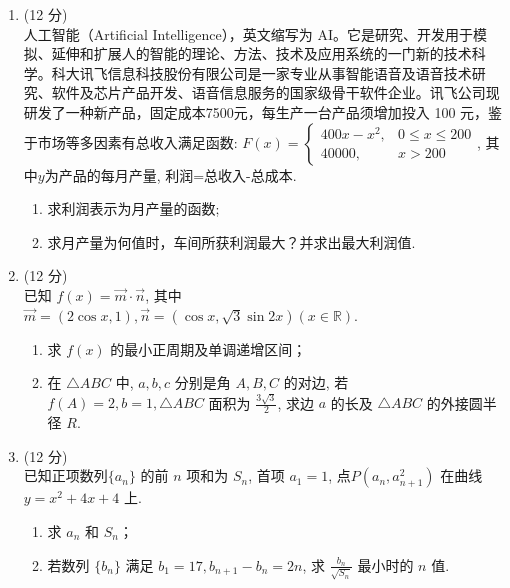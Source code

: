 \documentclass[17pt,twoside,space]{ctexart}
\begin{document}
\begin{enumerate}[itemsep=-0.3em,topsep=0pt,resume]
\vspace{220pt}

\item (12 分)\\
人工智能（Artificial Intelligence），英文缩写为 AI。它是研究、开发用于模拟、延伸和扩展人的智能的理论、方法、技术及应用系统的一门新的技术科学。科大讯飞信息科技股份有限公司是一家专业从事智能语音及语音技术研究、软件及芯片产品开发、语音信息服务的国家级骨干软件企业。讯飞公司现研发了一种新产品，固定成本7500元，每生产一台产品须增加投入 100 元，鉴于市场等多因素有总收入满足函数: $F(x) = \left\{\begin{array}{ll}
	400x-x^2, & 0 \leqslant x \leqslant 200\\
	40000, & x > 200
	\end{array}\right.$, 其中$y$为产品的每月产量, 利润=总收入-总成本.
	\begin{enumerate}[itemsep=-0.3em,label={(\arabic*)},topsep=0pt,labelsep=.5em,leftmargin=1.7em]
		\item 求利润表示为月产量的函数; 
		\item 求月产量为何值时，车间所获利润最大？并求出最大利润值. 
	\end{enumerate}

\newpage

\item (12 分)\\
已知 $f(x) = \vec{m} \cdot \vec{n}$, 其中 $\vec{m}=(2\cos x, 1), \vec{n}=(\cos x, \sqrt{3}\sin 2x) (x\in \mathbb{R})$. 
    \begin{enumerate}[itemsep=-0.3em,label={(\arabic*)},topsep=0pt,labelsep=.5em,leftmargin=1.7em]
		\item 求 $f(x)$ 的最小正周期及单调递增区间；
		\item 在 $\triangle ABC$ 中, $a, b, c$ 分别是角 $A, B, C$ 的对边, 若 $f(A)=2, b=1, \triangle ABC$ 面积为 $\frac{3\sqrt{3}}{2}$, 求边 $a$ 的长及 $\triangle ABC$ 的外接圆半径 $R$.
	\end{enumerate}

	\vspace{250pt}

\item (12 分)\\
已知正项数列$\{a_n\}$ 的前 $n$ 项和为 $S_n$, 首项 $a_1=1$,  点$P(a_n, a_{n+1}^2)$ 在曲线 $y = x^2+4x+4$ 上. 
    \begin{enumerate}[itemsep=-0.3em,label={(\arabic*)},topsep=0pt,labelsep=.5em,leftmargin=1.7em]
		\item 求 $a_n$ 和 $S_n$；
		\item 若数列 $\{b_n\}$ 满足 $b_1=17, b_{n+1}-b_n = 2n$, 求 $\frac{b_n}{\sqrt{S_n}}$ 最小时的 $n$ 值.
	\end{enumerate}

\end{enumerate}



\clearpage
\end{document}
